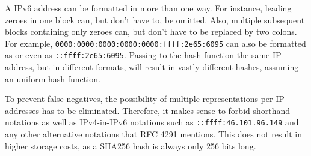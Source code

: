 A IPv6 address can be formatted in more than one way. \cite{RFC4291I66} For instance, leading zeroes in one block can, but don't have to, be omitted. Also, multiple subsequent blocks containing only zeroes can, but don't have to be replaced by two colons.
For example, \texttt{0000:0000:0000:0000:0000:ffff:2e65:6095} can also be formatted as
 or even as \texttt{::ffff:2e65:6095}. Passing to the hash function the same IP address, but in different formats, will result in vastly different hashes, assuming an uniform hash function.

To prevent false negatives, the possibility of multiple representations per IP addresses has to be eliminated. Therefore, it makes sense to forbid shorthand notations as well as IPv4-in-IPv6 notations such as \texttt{::ffff:46.101.96.149} and any other alternative notations that RFC 4291 \cite{RFC4291I66} mentions.
This does not result in higher storage costs, as a SHA256 hash is always only 256 bits long.

